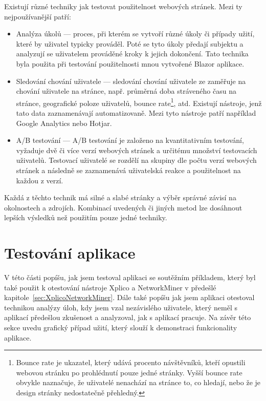     Existují různé techniky jak testovat použitelnost webových stránek. Mezi ty nejpoužívanější patří:
    \begin{itemize}
        \item Analýza úkolů --- proces, při kterém se vytvoří různé úkoly či případy užití, které by uživatel typicky prováděl. Poté se tyto úkoly předají subjektu a analyzují se uživatelem prováděné kroky k jejich dokončení. Tato technika byla použita při testování použitelnosti mnou vytvořené Blazor aplikace.
        \item Sledování chování uživatele --- sledování chování uživatele ze zaměřuje na chování uživatele na stránce, např. průměrná doba stráveného času na stránce, geografické poloze uživatelů, bounce rate\footnote{Bounce rate je ukazatel, který udává procento návštěvníků, kteří opustili webovou stránku po prohlédnutí pouze jedné stránky. Vyšší bounce rate obvykle naznačuje, že uživatelé nenachází na stránce to, co hledají, nebo že je design stránky nedostatečně přehledný.}, atd. Existují nástroje, jenž tato data zaznamenávají automatizovaně. Mezi tyto nástroje patří například Google Analytics nebo Hotjar.
        \item A/B testování --- A/B testování je založeno na kvantitativním testování, vyžaduje dvě či více verzí webových stránek a určitému množství testovacích uživatelů. Testovací uživatelé se rozdělí na skupiny dle počtu verzí webových stránek a následně se zaznamenává uživatelská reakce a použitelnost na každou z verzí.
    \end{itemize}
    
    Každá z těchto technik má silné a slabé stránky a výběr správné závisí na okolnostech a zdrojích. Kombinací uvedených či jiných metod lze dosáhnout lepších výsledků než použitím pouze jedné techniky.

    \section{Testování aplikace}
    V této části popíšu, jak jsem testoval aplikaci se soutěžním příkladem, který byl také použit k otestování nástroje Xplico a NetworkMiner v předešlé kapitole~\ref{sec:XplicoNetworkMiner}. Dále také popíšu jak jsem aplikaci otestoval technikou analýzy úloh, kdy jsem vzal nezávislého uživatele, který neměl s aplikací předešlou zkušenost a analyzoval, jak s aplikací pracuje. Na závěr této sekce uvedu grafický případ užití, který slouží k demonstraci funkcionality aplikace.

